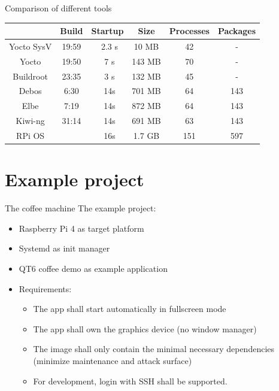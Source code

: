 \documentclass{beamer}
\begin{document}
\begin{frame}{Comparison of different tools}
	\begin{tabular}{c|ccccc}
		& \textbf{Build} & \textbf{Startup} & \textbf{Size} & \textbf{Processes} & \textbf{Packages} \\
		\hline
		Yocto SysV & 19:59 & ~2.3 s & 10 MB & 42 & - \\ 
		\hline
		Yocto & 19:50 & ~7 s & 143 MB & 70 & - \\
 		Buildroot & 23:35 & ~3 s & 132 MB & 45 & - \\
		\hline
		Debos & 6:30 & ~14s & 701 MB & 64 & 143 \\
		Elbe & 7:19 & ~14s & 872 MB & 64 & 143 \\
		Kiwi-ng & 31:14 & ~14s & 691 MB & 63 & 143 \\
		\hline
		RPi OS & & ~16s & 1.7 GB & 151 & 597 \\
	\end{tabular}
\end{frame}

\section{Example project}

\begin{frame}{The coffee machine}
	The example project:
	\begin{itemize}
		\item Raspberry Pi 4 as target platform
		\item Systemd as init manager
		\item QT6 coffee demo as example application
		\item Requirements:
		\begin{itemize}
			\item The app shall start automatically in fullscreen mode
			\item The app shall own the graphics device (no window manager)
			\item The image shall only contain the minimal necessary dependencies (minimize maintenance and attack surface)
			\item For development, login with SSH shall be supported.
		\end{itemize}
	\end{itemize}
\end{frame}
\end{document}
